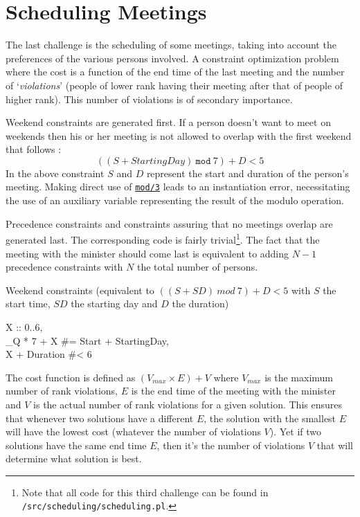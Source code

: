 \section{Scheduling Meetings}

The last challenge is the scheduling of some meetings, taking into account the preferences of the various persons involved. A constraint optimization problem where the cost is a function of the end time of the last meeting and the number of `\textit{violations}' (people of lower rank having their meeting after that of people of higher rank). This number of violations is of secondary importance.\\\par

Weekend constraints are generated first. If a person doesn't want to meet on weekends then his or her meeting is not allowed to overlap with the first weekend that follows :
$$((S + \textit{StartingDay})\ \texttt{mod}\ 7) + D <  5$$
In the above constraint $S$ and $D$ represent the start and duration of the person's meeting. Making direct use of \href{https://www.eclipseclp.org/doc/bips/kernel/arithmetic/mod-3.html}{\texttt{mod/3}} leads to an instantiation error, necessitating the use of an auxiliary variable representing the result of the modulo operation.\\\par
Precedence constraints and constraints assuring that no meetings overlap are generated last. The corresponding code is fairly trivial\footnote{Note that all code for this third challenge can be found in \texttt{/src/scheduling/scheduling.pl}.}. The fact that the meeting with the minister should come last is equivalent to adding $N-1$ precedence constraints with $N$ the total number of persons.

\begin{snippet}[H]
\caption{Weekend constraints (equivalent to $((S + SD)\ mod\ 7) + D < 5$ with $S$ the start time, $SD$ the starting day and $D$ the duration)}\label{weekend}
\small
X :: 0..6,\\
\_Q * 7 + X \#= Start + StartingDay,\\
X + Duration \#< 6
\end{snippet}

The cost function is defined as $(V_{max}\times E)+V$ where $V_{max}$ is the maximum number of rank violations, $E$ is the end time of the meeting with the minister and $V$ is the actual number of rank violations for a given solution. This ensures that whenever two solutions have a different $E$, the solution with the smallest $E$ will have the lowest cost (whatever the number of violations $V$). Yet if two solutions have the same end time $E$, then it's the number of violations $V$ that will determine what solution is best.

